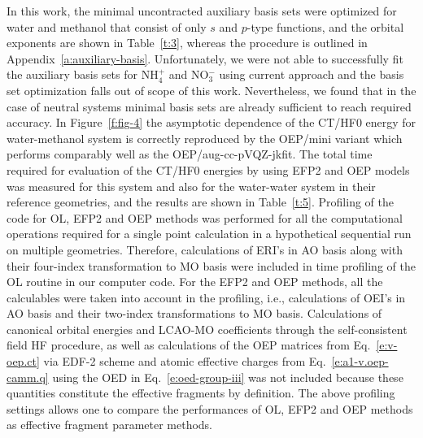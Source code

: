 \documentclass[aip,jcp,amsmath,amssymb,reprint,floatfix]{revtex4-1}
\begin{document}
In this work, the minimal uncontracted auxiliary basis sets were optimized for water and methanol
that consist of only $s$ and $p$\hyp{}type functions,
and the orbital exponents are shown in Table~\ref{t:3},
whereas the procedure is outlined in Appendix~\ref{a:auxiliary-basis}.
Unfortunately, we were not able to successfully fit the auxiliary basis sets
for NH$_4^+$ and NO$_3^-$ using current approach
and the basis set optimization falls out of scope of this work.
Nevertheless, we found that in the case of neutral systems minimal basis
sets are already sufficient to reach required accuracy.
In Figure~\ref{f:fig-4} the asymptotic dependence of the CT/HF0 energy
for water\hyp{}methanol system is correctly reproduced by the OEP/mini variant
which
performs comparably well as the OEP/aug-cc-pVQZ-jkfit. 
The total time required for evaluation of the CT/HF0 energies by using EFP2 and OEP
models was measured for this system and also for the water-water system in their reference geometries,
and the results are shown in Table~\ref{t:5}. 
Profiling of the code for OL, EFP2 and OEP methods was performed 
for all the computational operations required for a
single point calculation in a hypothetical sequential run on multiple
geometries. Therefore, calculations of ERI's in AO basis 
along with their four\hyp{}index transformation to MO basis were included in
time profiling of the OL routine in our computer code. For the EFP2 
and OEP methods, all the calculables were taken into account in the profiling,
i.e., calculations of OEI's in AO basis and their two\hyp{}index transformations
to MO basis. Calculations of canonical orbital 
energies and LCAO\hyp{}MO coefficients through the self\hyp{}consistent field
HF procedure, as well as calculations of the
OEP matrices from Eq.~\eqref{e:v-oep.ct} 
via EDF-2 scheme and atomic effective charges from Eq.~\eqref{e:a1-v.oep-camm.q}
using the OED in Eq.~\eqref{e:oed-group-iii}
was not included because these quantities constitute the effective fragments
by definition.
The above profiling settings allows one to compare the performances
of OL, EFP2 and OEP methods as effective fragment parameter methods.
\end{document}
